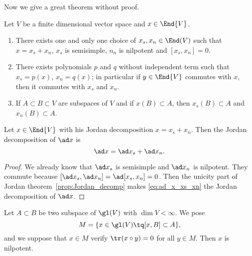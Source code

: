Now we give a great theorem without proof.
\begin{theorem}
Let $V$ be a finite dimensional vector space and $x\in\End{V}$.

\begin{enumerate}
\item There exists one and only one choice of $x_s,x_n\in\End(V)$ such that $x=x_s+x_n$, $x_s$ is semisimple, $n_n$ is nilpotent and $[x_s,x_n]=0$.

\item There exists polynomials $p$ and $q$ without independent term such that $x_s=p(x)$, $x_n=q(x)$; in particular if $y\in\End{V}$ commutes with $x$, then it commutes with $x_s$ and $x_n$.

\item If $A\subset B\subset V$ are subspaces of $V$ and if $x(B)\subset A$, then $x_s(B)\subset A$ and $x_n(B)\subset A$.
\end{enumerate}
\label{prop:Jordan_decomp}
\end{theorem}

\begin{lemma}\label{lem:Jordan_ad}
    Let $x\in\End{V}$ with his Jordan decomposition $x=x_s+x_n$. Then the Jordan decomposition of $\ad x$ is
    \begin{equation}\label{eq:ad_x_xs_xn}
       \ad x=\ad x_s+\ad x_n.
    \end{equation}
\end{lemma}

\begin{proof}
We already know that $\ad x_s$ is semisimple and $\ad x_n$ is nilpotent. They commute because $[\ad x_s,\ad x_n]=\ad[x_s,x_n]=0$. Then the unicity part of Jordan theorem~\ref{prop:Jordan_decomp} makes \eqref{eq:ad_x_xs_xn} the Jordan decomposition of $\ad x$.
\end{proof}

\begin{lemma}\label{lem:M_nil}
Let $A\subset B$ be two subspace of $\gl(V)$ with $\dim V<\infty$. We pose
\[
   M=\{x\in\gl(V)\tq [x,B]\subset A\},
\]
and we suppose that $x\in M$ verify $\tr(x\circ y)=0$ for all $y\in M$. Then $x$ is nilpotent.
\end{lemma}

